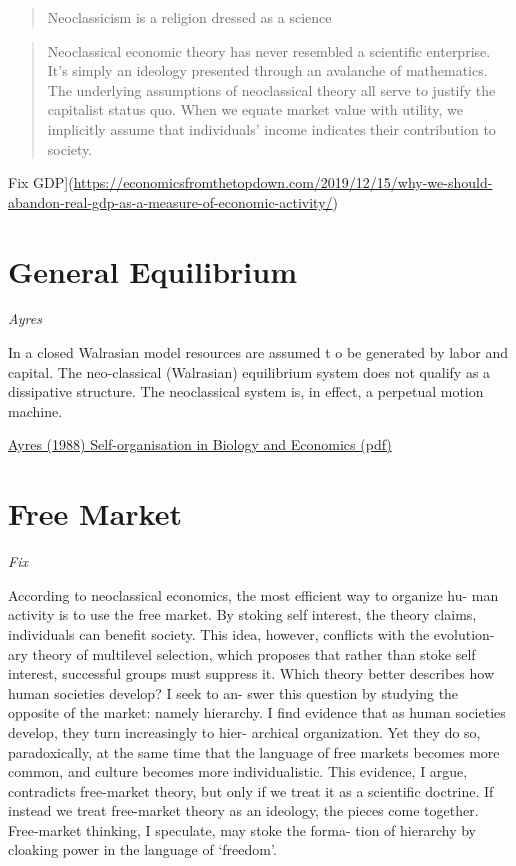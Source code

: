 \documentclass[
]{book}
\begin{document}
\begin{quote}
Neoclassicism is a religion dressed as a science
\end{quote}

\begin{quote}
Neoclassical economic theory has never resembled a scientific enterprise. It's simply an ideology presented through an avalanche of mathematics. The underlying assumptions of neoclassical theory all serve to justify the capitalist status quo. When we equate market value with utility, we implicitly assume that individuals' income indicates their contribution to society.
\end{quote}

Fix GDP{]}(\url{https://economicsfromthetopdown.com/2019/12/15/why-we-should-abandon-real-gdp-as-a-measure-of-economic-activity/})

\hypertarget{general-equilibrium}{%
\section{General Equilibrium}\label{general-equilibrium}}

\emph{Ayres}

In a closed Walrasian model resources are assumed t o be generated by
labor and capital. The neo-classical (Walrasian) equilibrium system does not
qualify as a dissipative structure. The neoclassical system is, in effect,
a perpetual motion machine.

\href{pdf/Ayres_1988_Self-organistaion_in_Biology_and_Economics.pdf}{Ayres (1988) Self-organisation in Biology and Economics (pdf)}

\hypertarget{free-market}{%
\section{Free Market}\label{free-market}}

\emph{Fix}

According to neoclassical economics, the most efficient way to organize hu-
man activity is to use the free market. By stoking self interest, the theory claims,
individuals can benefit society. This idea, however, conflicts with the evolution-
ary theory of multilevel selection, which proposes that rather than stoke self
interest, successful groups must suppress it.
Which theory better describes how human societies develop? I seek to an-
swer this question by studying the opposite of the market: namely hierarchy. I
find evidence that as human societies develop, they turn increasingly to hier-
archical organization. Yet they do so, paradoxically, at the same time that the
language of free markets becomes more common, and culture becomes more
individualistic.
This evidence, I argue, contradicts free-market theory, but only if we treat it
as a scientific doctrine. If instead we treat free-market theory as an ideology, the
pieces come together. Free-market thinking, I speculate, may stoke the forma-
tion of hierarchy by cloaking power in the language of `freedom'.
\end{document}
